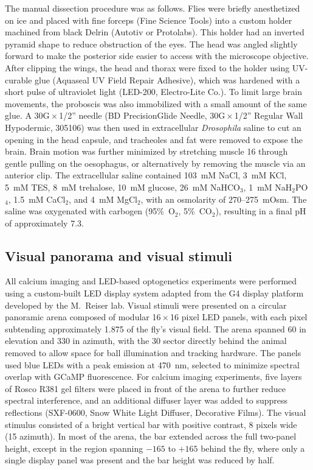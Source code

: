 The manual dissection procedure was as follows. Flies were briefly anesthetized on ice and placed with fine forceps (Fine Science Tools) into a custom holder machined from black Delrin (Autotiv or Protolabs). This holder had an inverted pyramid shape to reduce obstruction of the eyes. The head was angled slightly forward to make the posterior side easier to access with the microscope objective. After clipping the wings, the head and thorax were fixed to the holder using UV-curable glue (Aquaseal UV Field Repair Adhesive), which was hardened with a short pulse of ultraviolet light (LED-200, Electro-Lite Co.). To limit large brain movements, the proboscis was also immobilized with a small amount of the same glue. A 30G\,$\times$\,1/2'' needle (BD PrecisionGlide Needle, 30G\,$\times$\,1/2'' Regular Wall Hypodermic, 305106) was then used in extracellular \textit{Drosophila} saline to cut an opening in the head capsule, and tracheoles and fat were removed to expose the brain. Brain motion was further minimized by stretching muscle 16 through gentle pulling on the oesophagus, or alternatively by removing the muscle via an anterior clip. The extracellular saline contained 103~mM NaCl, 3~mM KCl, 5~mM TES, 8~mM trehalose, 10~mM glucose, 26~mM NaHCO$_3$, 1~mM NaH$_2$PO$_4$, 1.5~mM CaCl$_2$, and 4~mM MgCl$_2$, with an osmolarity of 270--275~mOsm. The saline was oxygenated with carbogen (95\%~O$_2$, 5\%~CO$_2$), resulting in a final pH of approximately 7.3.

\subsection{Visual panorama and visual stimuli}

All calcium imaging and LED-based optogenetics experiments were performed using a custom-built LED display system adapted from the G4 display platform developed by the M.~Reiser lab. Visual stimuli were presented on a circular panoramic arena composed of modular 16\,$\times$\,16 pixel LED panels, with each pixel subtending approximately 1.875\textdegree{} of the fly's visual field. The arena spanned 60\textdegree{} in elevation and 330\textdegree{} in azimuth, with the 30\textdegree{} sector directly behind the animal removed to allow space for ball illumination and tracking hardware. The panels used blue LEDs with a peak emission at 470~nm, selected to minimize spectral overlap with GCaMP fluorescence. For calcium imaging experiments, five layers of Rosco R381 gel filters were placed in front of the arena to further reduce spectral interference, and an additional diffuser layer was added to suppress reflections (SXF-0600, Snow White Light Diffuser, Decorative Films). The visual stimulus consisted of a bright vertical bar with positive contrast, 8 pixels wide (15\textdegree{} azimuth). In most of the arena, the bar extended across the full two-panel height, except in the region spanning $-165$\textdegree{} to $+165$\textdegree{} behind the fly, where only a single display panel was present and the bar height was reduced by half.

